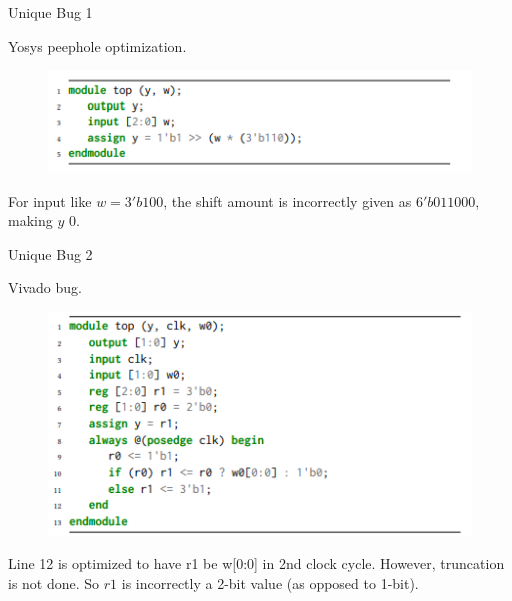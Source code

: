 \documentclass[notes, xcolor=dvipsnames]{beamer}
\begin{document}
    \begin{frame}{Unique Bug 1}
        
        Yosys peephole optimization.
        \begin{figure}
            \includegraphics{Yosys_Peephole.PNG}
        \end{figure}

        For input like $w=3'b100$, the shift amount is incorrectly given as $6'b011000$, making $y$ $0$.

    \end{frame}


    \begin{frame}{Unique Bug 2}
        
        Vivado bug.
        \begin{figure}
            \includegraphics{Vivado.PNG}
        \end{figure}

        Line 12 is optimized to have r1 be w[0:0] in 2nd clock cycle.
        However, truncation is not done. So $r1$ is incorrectly a 2-bit value (as opposed to 1-bit).

    \end{frame}
\end{document}
